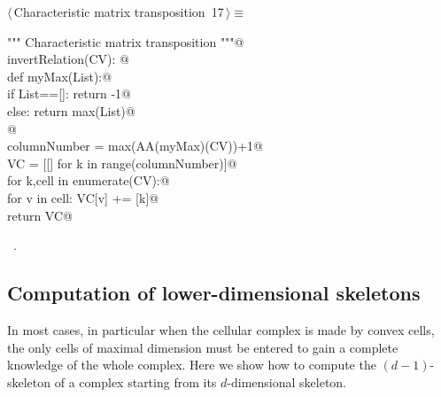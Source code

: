 \documentclass[11pt,oneside]{article}	%
\begin{document}
\begin{flushleft} \small \label{scrap27}
\protect{}$\langle\,$Characteristic matrix transposition\nobreak\ {\footnotesize 17}$\,\rangle\equiv$
\vspace{-1ex}
\begin{list}{}{} \item
\mbox{}\verb@""" Characteristic matrix transposition """@\\
\mbox{}\verb@def invertRelation(CV):    @\\
\mbox{}\verb@    def myMax(List):@\\
\mbox{}\verb@        if List==[]:  return -1@\\
\mbox{}\verb@        else:  return max(List)@\\
\mbox{}\verb@            @\\
\mbox{}\verb@    columnNumber = max(AA(myMax)(CV))+1@\\
\mbox{}\verb@    VC = [[] for k in range(columnNumber)]@\\
\mbox{}\verb@    for k,cell in enumerate(CV):@\\
\mbox{}\verb@        for v in cell: VC[v] += [k]@\\
\mbox{}\verb@    return VC@\\
\mbox{}\verb@@{\NWsep}
\end{list}
\vspace{-1ex}
\footnotesize\addtolength{\baselineskip}{-1ex}
\begin{list}{}{\setlength{\itemsep}{-\parsep}\setlength{\itemindent}{-\leftmargin}}
\item \NWtxtMacroRefIn\ .
\end{list}
\end{flushleft}


\subsection{Computation of lower-dimensional skeletons}

In most cases, in particular when the cellular complex is made by convex cells, the only cells of maximal dimension must be entered to gain a complete knowledge of the whole complex.
Here we show how to compute the $(d-1)$-skeleton of a complex starting from its $d$-dimensional skeleton.
\end{document}
